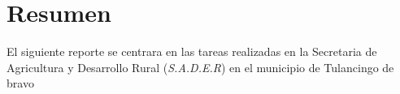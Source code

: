 \section{Resumen}
El siguiente reporte se centrara en las tareas realizadas en la Secretaria de Agricultura y Desarrollo Rural
(\textit{S.A.D.E.R}) en el municipio de Tulancingo de bravo